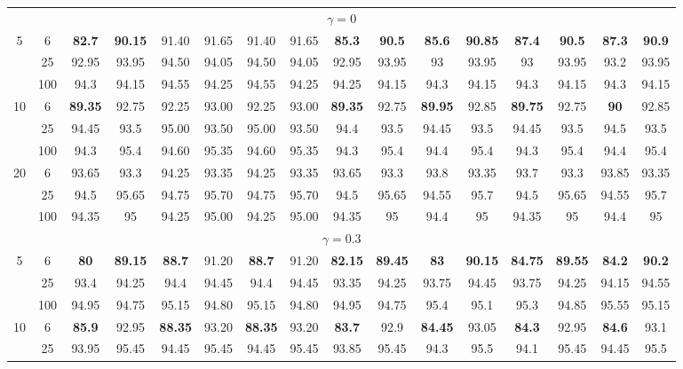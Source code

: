 \documentclass[
  man]{apa6}
\newenvironment{lltable}{\begin{landscape}\centering\begin{ThreePartTable}}{\end{ThreePartTable}\end{landscape}}
\begin{document}
\begin{lltable}
{\begin{longtable}{cccccccccccccccc}
\midrule
\endhead
\multicolumn{16}{c}{$\gamma = 0$}\\
5 & 6 & \textbf{82.7} & \textbf{90.15} & 91.40 & 91.65 & 91.40 & 91.65 & \textbf{85.3} & \textbf{90.5} & \textbf{85.6} & \textbf{90.85} & \textbf{87.4} & \textbf{90.5} & \textbf{87.3} & \textbf{90.9}\\
 & 25 & 92.95 & 93.95 & 94.50 & 94.05 & 94.50 & 94.05 & 92.95 & 93.95 & 93 & 93.95 & 93 & 93.95 & 93.2 & 93.95\\
 & 100 & 94.3 & 94.15 & 94.55 & 94.25 & 94.55 & 94.25 & 94.25 & 94.15 & 94.3 & 94.15 & 94.3 & 94.15 & 94.3 & 94.15\\
10 & 6 & \textbf{89.35} & 92.75 & 92.25 & 93.00 & 92.25 & 93.00 & \textbf{89.35} & 92.75 & \textbf{89.95} & 92.85 & \textbf{89.75} & 92.75 & \textbf{90} & 92.85\\
 & 25 & 94.45 & 93.5 & 95.00 & 93.50 & 95.00 & 93.50 & 94.4 & 93.5 & 94.45 & 93.5 & 94.45 & 93.5 & 94.5 & 93.5\\
 & 100 & 94.3 & 95.4 & 94.60 & 95.35 & 94.60 & 95.35 & 94.3 & 95.4 & 94.4 & 95.4 & 94.3 & 95.4 & 94.4 & 95.4\\
20 & 6 & 93.65 & 93.3 & 94.25 & 93.35 & 94.25 & 93.35 & 93.65 & 93.3 & 93.8 & 93.35 & 93.7 & 93.3 & 93.85 & 93.35\\
 & 25 & 94.5 & 95.65 & 94.75 & 95.70 & 94.75 & 95.70 & 94.5 & 95.65 & 94.55 & 95.7 & 94.5 & 95.65 & 94.55 & 95.7\\
 & 100 & 94.35 & 95 & 94.25 & 95.00 & 94.25 & 95.00 & 94.35 & 95 & 94.4 & 95 & 94.35 & 95 & 94.4 & 95\\
\multicolumn{16}{c}{$\gamma = 0.3$}\\
5 & 6 & \textbf{80} & \textbf{89.15} & \textbf{88.7} & 91.20 & \textbf{88.7} & 91.20 & \textbf{82.15} & \textbf{89.45} & \textbf{83} & \textbf{90.15} & \textbf{84.75} & \textbf{89.55} & \textbf{84.2} & \textbf{90.2}\\
 & 25 & 93.4 & 94.25 & 94.4 & 94.45 & 94.4 & 94.45 & 93.35 & 94.25 & 93.75 & 94.45 & 93.75 & 94.25 & 94.15 & 94.55\\
 & 100 & 94.95 & 94.75 & 95.15 & 94.80 & 95.15 & 94.80 & 94.95 & 94.75 & 95.4 & 95.1 & 95.3 & 94.85 & 95.55 & 95.15\\
10 & 6 & \textbf{85.9} & 92.95 & \textbf{88.35} & 93.20 & \textbf{88.35} & 93.20 & \textbf{83.7} & 92.9 & \textbf{84.45} & 93.05 & \textbf{84.3} & 92.95 & \textbf{84.6} & 93.1\\
 & 25 & 93.95 & 95.45 & 94.45 & 95.45 & 94.45 & 95.45 & 93.85 & 95.45 & 94.3 & 95.5 & 94.1 & 95.45 & 94.45 & 95.5\\

\end{longtable}}
\end{lltable}
\end{document}
